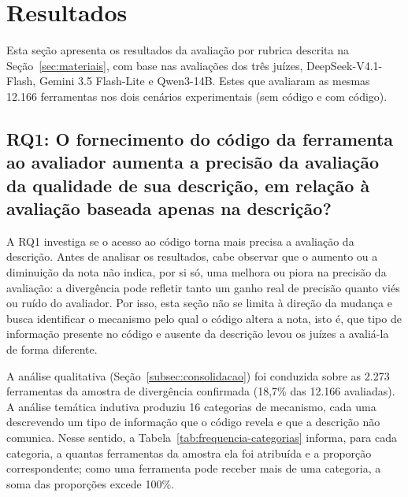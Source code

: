 
\section{Resultados}
\label{sec:resultados}


Esta seção apresenta os resultados da avaliação por rubrica descrita na Seção~\ref{sec:materiais}, com base nas avaliações dos três juízes, DeepSeek-V4.1-Flash, Gemini 3.5 Flash-Lite e Qwen3-14B. Estes que avaliaram as mesmas 12.166 ferramentas nos dois cenários experimentais (sem código e com código).




\subsection{RQ1: O fornecimento do código da ferramenta ao avaliador aumenta a precisão da avaliação da qualidade de sua descrição, em relação à avaliação baseada apenas na descrição?}

A RQ1 investiga se o acesso ao código torna mais precisa a avaliação da descrição. Antes de analisar os resultados, cabe observar que o aumento ou a diminuição da nota não indica, por si só, uma melhora ou piora na precisão da avaliação: a divergência pode refletir tanto um ganho real de precisão quanto viés ou ruído do avaliador. Por isso, esta seção não se limita à direção da mudança e busca identificar o mecanismo pelo qual o código altera a nota, isto é, que tipo de informação presente no código e ausente da descrição levou os juízes a avaliá-la de forma diferente.

A análise qualitativa (Seção~\ref{subsec:consolidacao}) foi conduzida sobre as 2.273 ferramentas da amostra de divergência confirmada (18,7\% das 12.166 avaliadas). A análise temática indutiva produziu 16 categorias de mecanismo, cada uma descrevendo um tipo de informação que o código revela e que a descrição não comunica. Nesse sentido, a Tabela~\ref{tab:frequencia-categorias} informa, para cada categoria, a quantas ferramentas da amostra ela foi atribuída e a proporção correspondente; como uma ferramenta pode receber mais de uma categoria, a soma das proporções excede 100\%.

